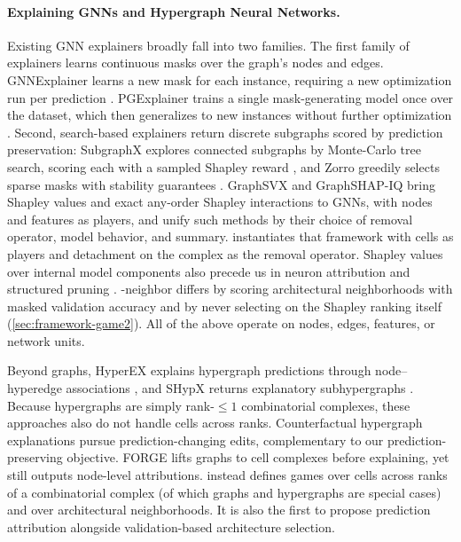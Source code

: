 \paragraph{Explaining GNNs and Hypergraph Neural Networks.}
Existing GNN explainers broadly fall into two families. The first family of explainers learns continuous masks over the graph's nodes and edges. GNNExplainer learns a new mask for each instance, requiring a new optimization run per prediction \citep{ying2019gnnexplainer}. PGExplainer trains a single mask-generating model once over the dataset, which then generalizes to new instances without further optimization \citep{luo2020parameterized}.
Second, search-based explainers return discrete subgraphs scored by prediction preservation: SubgraphX explores connected subgraphs by Monte-Carlo tree search, scoring each with a sampled Shapley reward
\citep{yuan2021subgraphx}, and Zorro greedily selects sparse masks with stability guarantees \citep{funke2023zorro}. GraphSVX \citep{duval2021graphsvx} and GraphSHAP-IQ
\citep{muschalik2024graphshapiq} bring Shapley values and exact any-order Shapley interactions to GNNs, with nodes and features as players, and \citet{covert2021explaining} unify such methods by their choice of removal operator, model behavior, and summary. \method instantiates that framework with cells as players and detachment on the complex as the removal operator. Shapley values over internal model components also precede us in neuron attribution \citep{ghorbani2020neuron} and structured pruning \citep{ancona2020shapleypruning}. \method-neighbor differs by scoring architectural neighborhoods with masked validation accuracy and by never selecting on the Shapley ranking itself (\cref{sec:framework-game2}). All of the above operate on nodes, edges, features, or network units. 

Beyond graphs, HyperEX explains hypergraph predictions through node--hyperedge associations \citep{maleki2023hyperex}, and SHypX returns explanatory subhypergraphs \citep{su2024shypx}. Because hypergraphs are simply rank-$\le 1$ combinatorial complexes, these approaches also do not handle cells across ranks. Counterfactual hypergraph explanations \citep{veglianti2026counterfactual} pursue prediction-changing edits, complementary to our prediction-preserving objective. FORGE \citep{sinha2025forge} lifts graphs to cell complexes before explaining, yet still outputs node-level attributions. \method instead defines games over cells across ranks of a combinatorial complex (of which graphs and hypergraphs are special cases) and over architectural neighborhoods. It is also the first to propose prediction attribution alongside validation-based architecture selection.